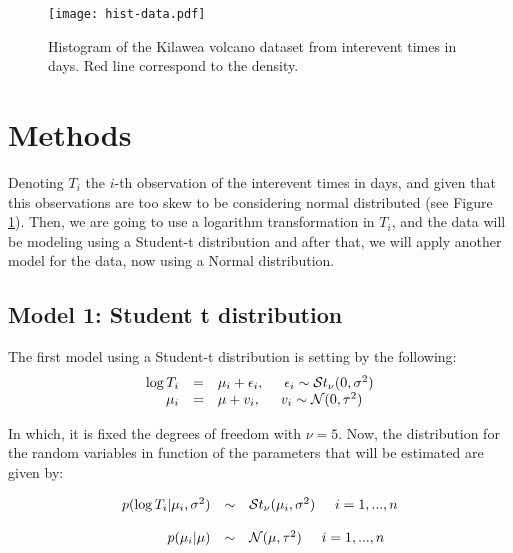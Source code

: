 \documentclass{asaproc}
\begin{document}
\begin{figure}[H]
\centering
\texttt{[image: hist-data.pdf]}
\caption{Histogram of the Kilawea volcano dataset from interevent times in days. Red line correspond to the density.}
\label{Fig1}
\end{figure}

\section{Methods} \label{method}

Denoting $T_i$ the $i$-th observation of the interevent times in days, and given that this observations are too skew to be considering normal distributed (see Figure \ref{Fig1}). Then, we are going to use a logarithm transformation in $T_i$, and the data will be modeling using a Student-t distribution and after that, we will apply another model for the data, now using a Normal distribution.

\subsection{Model 1: Student t distribution} 

The first model using a Student-t distribution is setting by the following:
\begin{eqnarray*}
\begin{array}{rcl }
\log T_i & = & \mu_i + \epsilon_i, \hspace{0.5cm} \epsilon_i \sim \mathcal{S}t_\nu(0,\sigma^2) \\

\mu_i & = & \mu + v_i, \hspace{0.5cm} v_i \sim \mathcal{N}(0,\tau^2) 
\end{array}
\end{eqnarray*}

In which, it is fixed the degrees of freedom with $\nu = 5$. Now, the distribution for the random variables in function of the parameters that will be estimated are given by:

\begin{eqnarray*}
\begin{array}{rcl}
p(\log T_i |\mu_i, \sigma^2) & \sim & \mathcal{S}t_\nu(\mu_i,\sigma^2) \hspace{0.5cm} i = 1,...,n\\ \\

p(\mu_i|\mu) & \sim & \mathcal{N}(\mu,\tau^2)  \hspace{0.5cm} i = 1,...,n
\end{array}
\end{eqnarray*}
\end{document}
